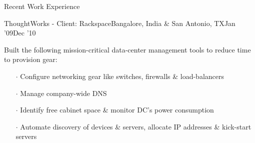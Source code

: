 \documentclass{resume} %
\begin{document}
\begin{rSection}{Recent Work Experience}
\begin{rSubsection}{ThoughtWorks - Client: Rackspace}{Bangalore, India \& San Antonio,
  TX}{Jan '09}{Dec '10}
\item Built the following mission-critical data-center management tools to reduce time to provision gear:
\vspace{-0.5em}
\begin{itemize}  \itemsep0.5pt \parskip0pt
    \item[$\cdot$] Configure networking gear like switches, firewalls \& load-balancers
    \item[$\cdot$] Manage company-wide DNS
    \item[$\cdot$] Identify free cabinet space \& monitor DC's power consumption
    \item[$\cdot$] Automate discovery of devices \& servers, allocate IP addresses \& kick-start servers
\end{itemize}

\end{rSubsection}








\end{rSection}
\end{document}
